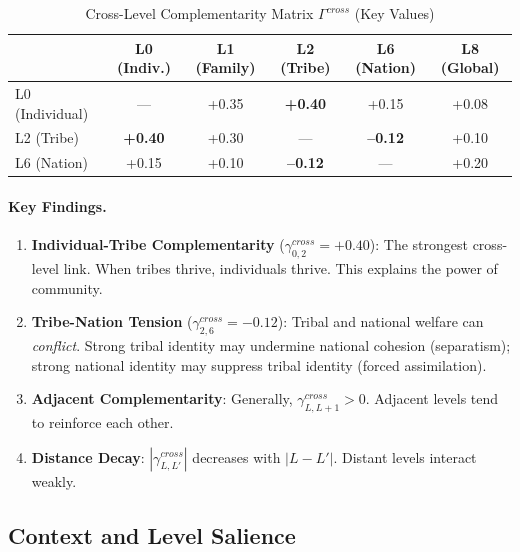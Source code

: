 \begin{table}[htbp]
\centering
\caption{Cross-Level Complementarity Matrix $\Gamma^{cross}$ (Key Values)}
\label{tab:gtwh-gamma-cross}
\renewcommand{\arraystretch}{1.3}
\begin{tabular}{@{}lccccc@{}}
\toprule
& L0 (Indiv.) & L1 (Family) & L2 (Tribe) & L6 (Nation) & L8 (Global) \\
\midrule
L0 (Individual) & --- & +0.35 & \textbf{+0.40} & +0.15 & +0.08 \\
L2 (Tribe) & \textbf{+0.40} & +0.30 & --- & \textbf{--0.12} & +0.10 \\
L6 (Nation) & +0.15 & +0.10 & \textbf{--0.12} & --- & +0.20 \\
\bottomrule
\end{tabular}
\end{table}

\paragraph{Key Findings.}
\begin{enumerate}
\item \textbf{Individual-Tribe Complementarity} ($\gamma^{cross}_{0,2} = +0.40$): 
The strongest cross-level link. When tribes thrive, individuals thrive. 
This explains the power of community.

\item \textbf{Tribe-Nation Tension} ($\gamma^{cross}_{2,6} = -0.12$): 
Tribal and national welfare can \textit{conflict}. Strong tribal identity 
may undermine national cohesion (separatism); strong national identity 
may suppress tribal identity (forced assimilation).

\item \textbf{Adjacent Complementarity}: Generally, $\gamma^{cross}_{L,L+1} > 0$. 
Adjacent levels tend to reinforce each other.

\item \textbf{Distance Decay}: $|\gamma^{cross}_{L,L'}|$ decreases with $|L - L'|$. 
Distant levels interact weakly.
\end{enumerate}

\subsection{Context and Level Salience}

